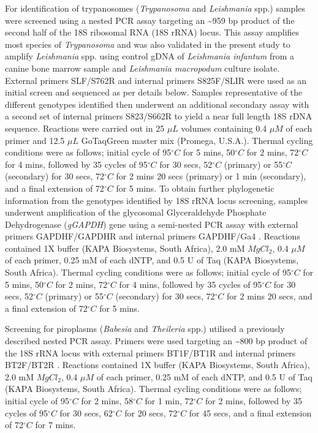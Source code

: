 \documentclass[a4paper, nobind]{templates/ociamthesis}
\begin{document}
For identification of trypanosomes (\emph{Trypanosoma} and \emph{Leishmania} spp.) samples were screened using a nested PCR assay targeting an \textasciitilde959 bp product of the second half of the 18S ribosomal RNA (18S rRNA) locus. This assay amplifies most species of \emph{Trypanosoma} \autocite{mcinnesTrypanosomaIrwiniSp2009} and was also validated in the present study to amplify \emph{Leishmania} spp. using control gDNA of \emph{Leishmania infantum} from a canine bone marrow sample and \emph{Leishmania macropodum} culture isolate. External primers SLF/S762R and internal primers S825F/SLIR were used as an initial screen and sequenced as per details below. Samples representative of the different genotypes identified then underwent an additional secondary assay with a second set of internal primers S823/S662R to yield a near full length 18S rDNA sequence. Reactions were carried out in 25 \(\mu L\) volumes containing 0.4 \(\mu M\) of each primer and 12.5 \(\mu L\) GoTaq\textregistered Green master mix (Promega, U.S.A.). Thermal cycling conditions were as follows; initial cycle of 95\(^\circ C\) for 5 mins, 50\(^\circ C\) for 2 mins, 72\(^\circ C\) for 4 mins, followed by 35 cycles of 95\(^\circ C\) for 30 secs, 52\(^\circ C\) (primary) or 55\(^\circ C\) (secondary) for 30 secs, 72\(^\circ C\) for 2 mins 20 secs (primary) or 1 min (secondary), and a final extension of 72\(^\circ C\) for 5 mins. To obtain further phylogenetic information from the genotypes identified by 18S rRNA locus screening, samples underwent amplification of the glycosomal Glyceraldehyde Phosphate Dehydrogenase (\emph{gGAPDH}) gene using a semi-nested PCR assay with external primers GAPDHF/GAPDHR and internal primers GAPDHF/Ga4 \autocite{mcinnesTrypanosomaIrwiniSp2009}. Reactions contained 1X buffer (KAPA Biosystems, South Africa), 2.0 mM \(MgCl_{2}\), 0.4 \(\mu M\) of each primer, 0.25 mM of each dNTP, and 0.5 U of Taq (KAPA Biosystems, South Africa). Thermal cycling conditions were as follows; initial cycle of 95\(^\circ C\) for 5 mins, 50\(^\circ C\) for 2 mins, 72\(^\circ C\) for 4 mins, followed by 35 cycles of 95\(^\circ C\) for 30 secs, 52\(^\circ C\) (primary) or 55\(^\circ C\) (secondary) for 30 secs, 72\(^\circ C\) for 2 mins 20 secs, and a final extension of 72\(^\circ C\) for 5 mins.

Screening for piroplasms (\emph{Babesia} and \emph{Theileria} spp.) utilised a previously described nested PCR assay. Primers were used targeting an \textasciitilde800 bp product of the 18S rRNA locus with external primers BT1F/BT1R and internal primers BT2F/BT2R \autocite{jefferiesPCRRFLPDetectionDifferentiation2007}. Reactions contained 1X buffer (KAPA Biosystems, South Africa), 2.0 mM \(MgCl_{2}\), 0.4 \(\mu M\) of each primer, 0.25 mM of each dNTP, and 0.5 U of Taq (KAPA Biosystems, South Africa). Thermal cycling conditions were as follows; initial cycle of 95\(^\circ C\) for 2 mins, 58\(^\circ C\) for 1 min, 72\(^\circ C\) for 2 mins, followed by 35 cycles of 95\(^\circ C\) for 30 secs, 62\(^\circ C\) for 20 secs, 72\(^\circ C\) for 45 secs, and a final extension of 72\(^\circ C\) for 7 mins.
\end{document}
